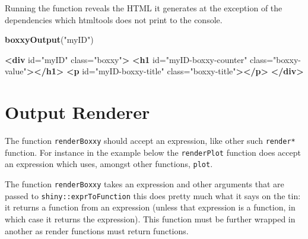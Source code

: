 \documentclass[10pt,]{krantz}
\makeatletter
\newenvironment{Shaded}{\begin{snugshade}}{\end{snugshade}}
\newcommand{\CommentTok}[1]{\textcolor[rgb]{0.37,0.37,0.37}{\textit{#1}}}
\newcommand{\KeywordTok}[1]{\textcolor[rgb]{0.27,0.27,0.27}{\textbf{#1}}}
\newcommand{\NormalTok}[1]{#1}
\newcommand{\OperatorTok}[1]{\textcolor[rgb]{0.43,0.43,0.43}{\textbf{#1}}}
\newcommand{\OtherTok}[1]{\textcolor[rgb]{0.37,0.37,0.37}{#1}}
\newcommand{\StringTok}[1]{\textcolor[rgb]{0.5,0.5,0.5}{#1}}
\newenvironment{kframe}{%
\medskip{}
\setlength{\fboxsep}{.8em}
 \def\at@end@of@kframe{}%
 \ifinner\ifhmode%
  \def\at@end@of@kframe{\end{minipage}}%
  \begin{minipage}{\columnwidth}%
 \fi\fi%
 \def\FrameCommand##1{\hskip\@totalleftmargin \hskip-\fboxsep
 \colorbox{shadecolor}{##1}\hskip-\fboxsep
     \hskip-\linewidth \hskip-\@totalleftmargin \hskip\columnwidth}%
 \MakeFramed {\advance\hsize-\width
   \@totalleftmargin\z@ \linewidth\hsize
   \@setminipage}}%
 {\par\unskip\endMakeFramed%
 \at@end@of@kframe}
\renewenvironment{Shaded}{\begin{kframe}}{\end{kframe}}
\makeatother
\begin{document}
Running the function reveals the HTML it generates at the exception of the dependencies which htmltools does not print to the console.

\begin{Shaded}
\begin{Highlighting}[]
\KeywordTok{boxxyOutput}\NormalTok{(}\StringTok{"myID"}\NormalTok{)}
\end{Highlighting}
\end{Shaded}

\begin{Shaded}
\begin{Highlighting}[]
\KeywordTok{<div}\OtherTok{ id=}\StringTok{"myID"}\OtherTok{ class=}\StringTok{"boxxy"}\KeywordTok{>}
  \KeywordTok{<h1}\OtherTok{ id=}\StringTok{"myID-boxxy-counter"}\OtherTok{ class=}\StringTok{"boxxy-value"}\KeywordTok{></h1>}
  \KeywordTok{<p}\OtherTok{ id=}\StringTok{"myID-boxxy-title"}\OtherTok{ class=}\StringTok{"boxxy-title"}\KeywordTok{></p>}
\KeywordTok{</div>}
\end{Highlighting}
\end{Shaded}

\hypertarget{shiny-output-renderer}{%
\section{Output Renderer}\label{shiny-output-renderer}}

The function \texttt{renderBoxxy} should accept an expression, like other such \texttt{render*} function. For instance in the example below the \texttt{renderPlot} function does accept an expression which uses, amongst other functions, \texttt{plot}.

\begin{Shaded}
\end{Shaded}

The function \texttt{renderBoxxy} takes an expression and other arguments that are passed to \texttt{shiny::exprToFunction} this does pretty much what it says on the tin: it returns a function from an expression (unless that expression is a function, in which case it returns the expression). This function must be further wrapped in another as render functions must return functions.
\end{document}
